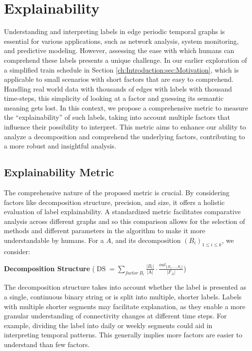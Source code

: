 \chapter{Explainability}
Understanding and interpreting labels in edge periodic temporal graphs is essential for various applications, such as network analysis, system monitoring, and predictive modeling.
However, assessing the ease with which humans can comprehend these labels presents a unique challenge.
In our earlier exploration of a simplified train schedule in Section \ref{ch:Introduction:sec:Motivation}, which is applicable to small scenarios with short factors that are easy to comprehend.
Handling real world data with thousands of edges with labels with thousand time-steps, this simplicity of looking at a factor and guessing its semantic meaning gets lost.
In this context, we propose a comprehensive metric to measure the \enquote{explainability} of such labels, taking into account multiple factors that influence their possibility to interpret.
This metric aims to enhance our ability to analyze a decomposition and comprehend the underlying factors, contributing to a more robust and insightful analysis.

\section{Explainability Metric}
The comprehensive nature of the proposed metric is crucial.
By considering factors like decomposition structure, precision, and size, it offers a holistic evaluation of label explainability.
A standardized metric facilitates comparative analysis across different graphs and so this comparison allows for the selection of methods and different parameters in the algorithm to make it more understandable by humans. For a \DFA $A$, and its decomposition $(B_i)_{1 \leq i \leq k}$, we consider:

\textbf{Decomposition Structure} ($\operatorname{DS} = \sum\limits_{factor~ B_i}\frac{|B_i|}{\text{|A|}} \cdot \frac{out_{\{B_1,\dots,B_i\}}}{|F_A|}$)

The decomposition structure takes into account whether the label is presented as a single, continuous binary string or is split into multiple, shorter labels.
Labels with multiple shorter segments may facilitate explanation, as they enable a more granular understanding of connectivity changes at different time steps.
For example, dividing the label into daily or weekly segments could aid in interpreting temporal patterns.
This generally implies more factors are easier to understand than few factors.


